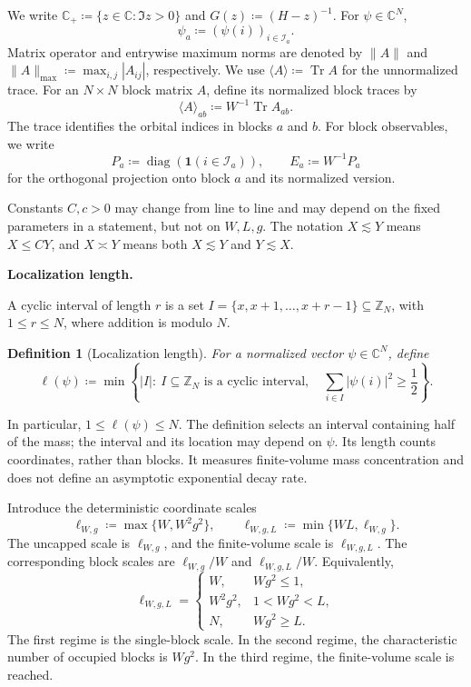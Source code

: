 \documentclass[11pt]{article}
\numberwithin{equation}{section}
\newtheorem{definition}[theorem]{Definition}
\theoremstyle{remark}
\newcommand{\Z}{\mathbb Z}
\newcommand{\C}{\mathbb C}
\newcommand{\Tr}{\operatorname{Tr}}
\newcommand{\diag}{\operatorname{diag}}
\newcommand{\ellscale}{\ell_{W,g}}
\newcommand{\ellstar}{\ell_{W,g,L}}
\begin{document}
We write \(\C_+\coloneqq \{z\in\C:\Im z>0\}\) and
\(G(z)\coloneqq (H-z)^{-1}\). For \(\psi\in\C^N\),
\[
 \psi_a\coloneqq (\psi(i))_{i\in\mathcal I_a}.
\]
Matrix operator and entrywise
maximum norms are denoted by \(\|A\|\) and
\(\|A\|_{\max}\coloneqq \max_{i,j}|A_{ij}|\), respectively.
We use \(\langle A\rangle\coloneqq \Tr A\) for the unnormalized trace.
For an $N\times N$ block matrix $A$, define its normalized block traces by
\[
 \langle A\rangle_{ab}\coloneqq W^{-1}\Tr A_{ab}.
\]
The trace identifies the orbital indices in blocks $a$ and $b$.
For block observables, we write
\[
 P_a\coloneqq \diag(\mathbf1(i\in\mathcal I_a)),\qquad E_a\coloneqq W^{-1}P_a
\]
for the orthogonal projection onto block $a$ and its normalized version.

Constants \(C,c>0\) may change from line to line and may depend on
the fixed parameters in a statement, but not on \(W,L,g\).
The notation \(X\lesssim Y\) means \(X\le CY\), and
\(X\asymp Y\) means both \(X\lesssim Y\) and \(Y\lesssim X\).

\medskip\noindent\textbf{Localization length.}

A cyclic interval of length \(r\) is a set
\(I=\{x,x+1,\ldots,x+r-1\}\subseteq\Z_N\), with
\(1\le r\le N\), where addition is modulo \(N\).
\begin{definition}[Localization length]\label{def:length}
For a normalized vector \(\psi\in\C^N\), define
\begin{equation}\label{eq:length}
 \ell(\psi)\coloneqq \min\left\{|I|:\ I\subseteq\Z_N\text{ is a cyclic interval},
                  \quad\sum_{i\in I}|\psi(i)|^2\ge\frac12\right\}.
\end{equation}
\end{definition}
In particular, \(1\le\ell(\psi)\le N\). The definition selects an
interval containing half of the mass; the interval and its location
may depend on \(\psi\). Its length counts coordinates, rather than
blocks. It measures finite-volume mass concentration and does not
define an asymptotic exponential decay rate.

Introduce the deterministic coordinate scales
\begin{equation}\label{eq:scales}
 \ellscale\coloneqq\max\{W,W^2g^2\},\qquad
 \ellstar\coloneqq\min\{WL,\ellscale\}.
\end{equation}
The uncapped scale is $\ellscale$, and the finite-volume scale is $\ellstar$.
The corresponding block scales are $\ellscale/W$ and $\ellstar/W$.
Equivalently,
\begin{equation}\label{eq:three-regimes}
 \ellstar=
 \begin{cases}
 W, & Wg^2\le1,\\
 W^2g^2, & 1<Wg^2<L,\\
 N, & Wg^2\ge L.
 \end{cases}
\end{equation}
The first regime is the single-block scale. In the second regime,
the characteristic number of occupied blocks is \(Wg^2\). In the
third regime, the finite-volume scale is reached.
\end{document}

